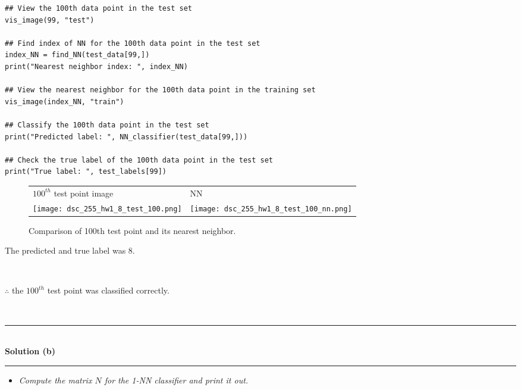 \documentclass{article}
\begin{document}
\begin{center}

\begin{lstlisting}
## View the 100th data point in the test set
vis_image(99, "test")

## Find index of NN for the 100th data point in the test set
index_NN = find_NN(test_data[99,])
print("Nearest neighbor index: ", index_NN)

## View the nearest neighbor for the 100th data point in the training set
vis_image(index_NN, "train")

## Classify the 100th data point in the test set
print("Predicted label: ", NN_classifier(test_data[99,]))

## Check the true label of the 100th data point in the test set
print("True label: ", test_labels[99])

\end{lstlisting}

\begin{figure}[htbp]
\centering
\begin{tabular}{>{\centering\arraybackslash}p{} >{\centering\arraybackslash}p{}}
$100^{th}$ test point image & NN \\
\texttt{[image: dsc\_255\_hw1\_8\_test\_100.png]} & \texttt{[image: dsc\_255\_hw1\_8\_test\_100\_nn.png]} \\
\end{tabular}
\caption{Comparison of 100th test point and its nearest neighbor.}
\label{fig:image_comparison}
\end{figure}
    
\end{center}

\parbox{\textwidth}{The predicted and true label was 8.}\\

\parbox{\textwidth}{$\therefore$ the $100^{th}$ test point was classified correctly.}\\

\noindent\rule{\textwidth}{0.4pt}\\
\newpage
\textbf{Solution (b)}

\noindent\rule{\textwidth}{0.4pt}

\begin{itemize}
    \item \textit{Compute the matrix $N$ for the 1-NN classifier and print it out.}
\end{itemize}
\end{document}
